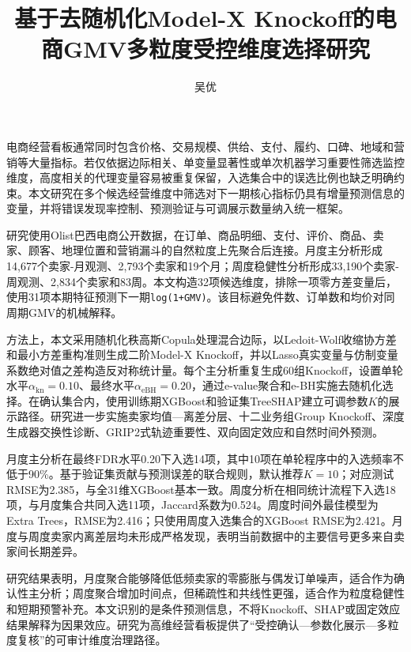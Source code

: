 \documentclass{sufethesismas}
\begin{document}
\classification{}
\confidential{}
\UDC{}
\serialnumber{}
\title{基于去随机化Model-X Knockoff的电商GMV多粒度受控维度选择研究}
\author{吴优}

\maketitle

\frontmatter
\begin{abstractCN}
电商经营看板通常同时包含价格、交易规模、供给、支付、履约、口碑、地域和营销等大量指标。若仅依据边际相关、单变量显著性或单次机器学习重要性筛选监控维度，高度相关的代理变量容易被重复保留，入选集合中的误选比例也缺乏明确约束。本文研究在多个候选经营维度中筛选对下一期核心指标仍具有增量预测信息的变量，并将错误发现率控制、预测验证与可调展示数量纳入统一框架。

研究使用Olist巴西电商公开数据，在订单、商品明细、支付、评价、商品、卖家、顾客、地理位置和营销漏斗的自然粒度上先聚合后连接。月度主分析形成14,677个卖家-月观测、2,793个卖家和19个月；周度稳健性分析形成33,190个卖家-周观测、2,834个卖家和83周。本文构造32项候选维度，排除一项零方差变量后，使用31项本期特征预测下一期\texttt{log(1+GMV)}。该目标避免件数、订单数和均价对同周期GMV的机械解释。

方法上，本文采用随机化秩高斯Copula处理混合边际，以Ledoit-Wolf收缩协方差和最小方差重构准则生成二阶Model-X Knockoff，并以Lasso真实变量与仿制变量系数绝对值之差构造反对称统计量。每个主分析重复生成60组Knockoff，设置单轮水平\(\alpha_{\mathrm{kn}}=0.10\)、最终水平\(\alpha_{\mathrm{eBH}}=0.20\)，通过e-value聚合和e-BH实施去随机化选择。在确认集合内，使用训练期XGBoost和验证集TreeSHAP建立可调参数\(K\)的展示路径。研究进一步实施卖家均值---离差分层、十二业务组Group Knockoff、深度生成器交换性诊断、GRIP2式轨迹重要性、双向固定效应和自然时间外预测。

月度主分析在最终FDR水平0.20下入选14项，其中10项在单轮程序中的入选频率不低于90\%。基于验证集贡献与预测误差的联合规则，默认推荐\(K=10\)；对应测试RMSE为2.385，与全31维XGBoost基本一致。周度分析在相同统计流程下入选18项，与月度集合共同入选11项，Jaccard系数为0.524。周度时间外最佳模型为Extra Trees，RMSE为2.416；只使用周度入选集合的XGBoost RMSE为2.421。月度与周度卖家内离差层均未形成严格发现，表明当前数据中的主要信号更多来自卖家间长期差异。

研究结果表明，月度聚合能够降低低频卖家的零膨胀与偶发订单噪声，适合作为确认性主分析；周度聚合增加时间点，但稀疏性和共线性更强，适合作为粒度稳健性和短期预警补充。本文识别的是条件预测信息，不将Knockoff、SHAP或固定效应结果解释为因果效应。研究为高维经营看板提供了``受控确认---参数化展示---多粒度复核''的可审计维度治理路径。
\end{abstractCN}
\end{document}
